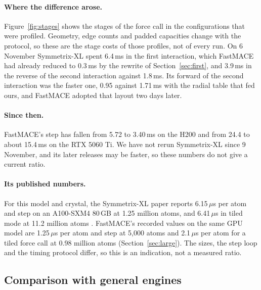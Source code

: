 \documentclass[11pt]{article}
\newcommand{\us}{\,\ensuremath{\mu}s}
\newcommand{\ms}{\,ms}
\begin{document}
\paragraph{Where the difference arose.}
Figure~\ref{fig:stages} shows the stages of the force call in the configurations that were profiled. Geometry,
edge counts and padded capacities change with the protocol, so these are the stage costs of those profiles, not
of every run. On 6 November Symmetrix-XL spent 6.4\ms{} in the first interaction, which FastMACE had already
reduced to 0.3\ms{} by the rewrite of Section~\ref{sec:first}, and 3.9\ms{} in the reverse of the second
interaction against 1.8\ms{}. Its forward of the second interaction was the faster one, 0.95 against 1.71\ms{}
with the radial table that fed ours, and FastMACE adopted that layout two days later.

\paragraph{Since then.}
FastMACE's step has fallen from 5.72 to 3.40\ms{} on the H200 and from 24.4 to about 15.4\ms{} on the RTX 5060
Ti. We have not rerun Symmetrix-XL since 9 November, and its later releases may be faster, so these numbers do
not give a current ratio.

\paragraph{Its published numbers.}
For this model and crystal, the Symmetrix-XL paper reports 6.15\us{} per atom and step on an A100-SXM4 80\,GB at
1.25 million atoms, and 6.41\us{} in tiled mode at 11.2 million atoms \cite{fu2026symmetrixxl}. FastMACE's
recorded values on the same GPU model are 1.25\us{} per atom and step at 5{,}000 atoms and 2.1\us{} per atom for
a tiled force call at 0.98 million atoms (Section~\ref{sec:large}). The sizes, the step loop and the timing
protocol differ, so this is an indication, not a measured ratio.

\subsection{Comparison with general engines}
\end{document}
